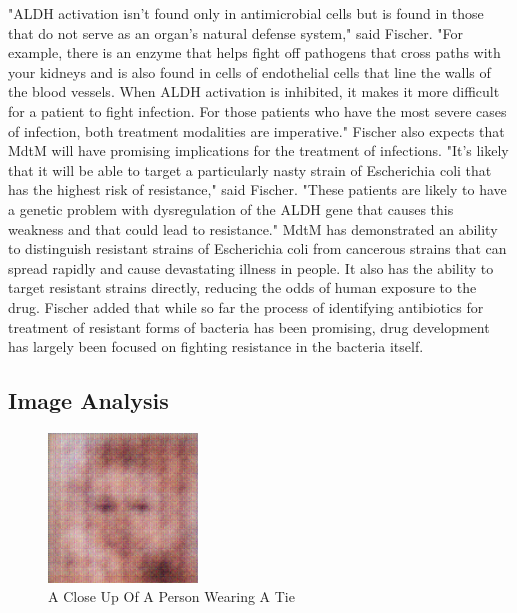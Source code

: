 \documentclass{article}%
\begin{document}
"ALDH activation isn't found only in antimicrobial cells but is found in those that do not serve as an organ's natural defense system," said Fischer. "For example, there is an enzyme that helps fight off pathogens that cross paths with your kidneys and is also found in cells of endothelial cells that line the walls of the blood vessels. When ALDH activation is inhibited, it makes it more difficult for a patient to fight infection. For those patients who have the most severe cases of infection, both treatment modalities are imperative."\newline%
Fischer also expects that MdtM will have promising implications for the treatment of infections.\newline%
"It's likely that it will be able to target a particularly nasty strain of Escherichia coli that has the highest risk of resistance," said Fischer. "These patients are likely to have a genetic problem with dysregulation of the ALDH gene that causes this weakness and that could lead to resistance."\newline%
MdtM has demonstrated an ability to distinguish resistant strains of Escherichia coli from cancerous strains that can spread rapidly and cause devastating illness in people. It also has the ability to target resistant strains directly, reducing the odds of human exposure to the drug.\newline%
Fischer added that while so far the process of identifying antibiotics for treatment of resistant forms of bacteria has been promising, drug development has largely been focused on fighting resistance in the bacteria itself.

%
\subsection{Image Analysis}%
\label{subsec:ImageAnalysis}%


\begin{figure}[h!]%
\centering%
\includegraphics[width=150px]{500_fake_images/samples_5_212.png}%
\caption{A Close Up Of A Person Wearing A Tie}%
\end{figure}

%
\end{document}
